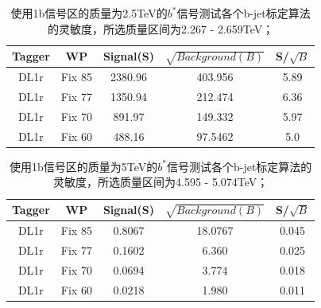 \begin{table}[ht]
        \begin{center}
                \begin{tabular}{|c|c|c|c|c|}\hline
                        Tagger       & WP          & Signal(S)    & $\sqrt{Background(B)}$    & S/$\sqrt{B}$ \\\hline
                        DL1r          & Fix 85      & 2380.96      &  403.956        & 5.89         \\
                        DL1r          & Fix 77      & 1350.94       & 212.474          & 6.36         \\
                        DL1r          & Fix 70      & 891.97     & 149.332      & 5.97       \\
                        DL1r          & Fix 60      & 488.16     &  97.5462       & 5.0     \\
                        \hline
                \end{tabular}
        \end{center}
        \caption{使用1b信号区的质量为2.5TeV的$b^*$信号测试各个b-jet标定算法的灵敏度，所选质量区间为2.267 - 2.659TeV； }
        \label{tab:Sensbstar2p5TeV}
\end{table}%


\begin{table}[ht]
        \begin{center}
                \begin{tabular}{|c|c|c|c|c|}\hline
                        Tagger       & WP          & Signal(S)    & $\sqrt{Background(B)}$    & S/$\sqrt{B}$ \\\hline
                        DL1r          & Fix 85      & 0.8067    &   18.0767       & 0.045        \\
                        DL1r          & Fix 77      & 0.1602      &  6.360         & 0.025       \\
                        DL1r          & Fix 70      & 0.0694     & 3.774       & 0.018       \\
                        DL1r          & Fix 60      & 0.0218      & 1.980         & 0.011       \\
                        \hline
                \end{tabular}
        \end{center}
        \caption{使用1b信号区的质量为5TeV的$b^*$信号测试各个b-jet标定算法的灵敏度，所选质量区间为4.595 - 5.074TeV；}
        \label{tab:Sensbstar5TeV}
\end{table}%


